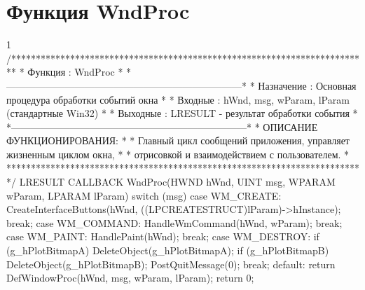 \section{Функция WndProc}
\footnotesize
\begin{listing}{1}
/*************************************************************************
* Функция       : WndProc                                                *
*------------------------------------------------------------------------*
* Назначение    : Основная процедура обработки событий окна              *
* Входные       : hWnd, msg, wParam, lParam (стандартные Win32)          *
* Выходные      : LRESULT - результат обработки события                  *
*------------------------------------------------------------------------*
* ОПИСАНИЕ ФУНКЦИОНИРОВАНИЯ:                                             *
* Главный цикл сообщений приложения, управляет жизненным циклом окна,    *
* отрисовкой и взаимодействием с пользователем.                          *
*************************************************************************/
LRESULT CALLBACK WndProc(HWND hWnd, UINT msg, WPARAM wParam, LPARAM lParam) {
    switch (msg) { case WM_CREATE: 
        CreateInterfaceButtons(hWnd, ((LPCREATESTRUCT)lParam)->hInstance); 
		break;
    case WM_COMMAND:  HandleWmCommand(hWnd, wParam); 
		break;
    case WM_PAINT: HandlePaint(hWnd); 
		break;
    case WM_DESTROY: if (g_hPlotBitmapA) DeleteObject(g_hPlotBitmapA);
        if (g_hPlotBitmapB) DeleteObject(g_hPlotBitmapB); PostQuitMessage(0); 
		break;
    default:  return DefWindowProc(hWnd, msg, wParam, lParam);}
    return 0;
}
\end{listing}
\normalsize

\pagebreak
